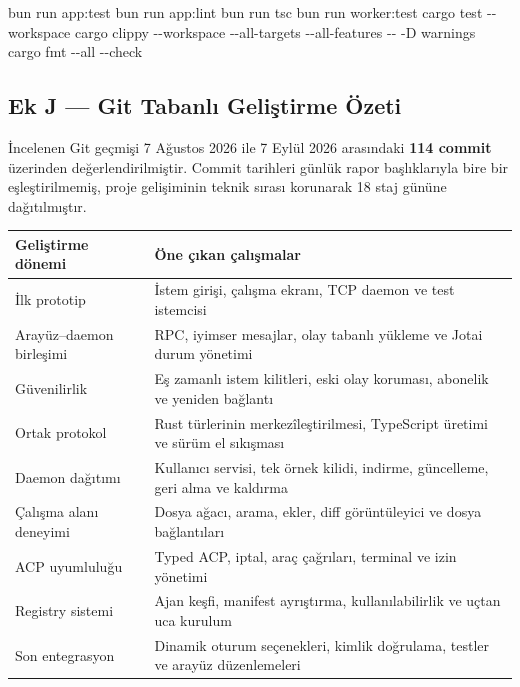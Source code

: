\documentclass[
  turkish,
  10pt,
  a4paper,
]{article}
\newenvironment{Shaded}{}{}
\newcommand{\AttributeTok}[1]{\textcolor[rgb]{0.49,0.56,0.16}{#1}}
\newcommand{\ExtensionTok}[1]{#1}
\newcommand{\NormalTok}[1]{#1}
\begin{document}
\begin{Shaded}
\begin{Highlighting}[]
\ExtensionTok{bun}\NormalTok{ run app:test}
\ExtensionTok{bun}\NormalTok{ run app:lint}
\ExtensionTok{bun}\NormalTok{ run tsc}
\ExtensionTok{bun}\NormalTok{ run worker:test}
\ExtensionTok{cargo}\NormalTok{ test }\AttributeTok{{-}{-}workspace}
\ExtensionTok{cargo}\NormalTok{ clippy }\AttributeTok{{-}{-}workspace} \AttributeTok{{-}{-}all{-}targets} \AttributeTok{{-}{-}all{-}features} \AttributeTok{{-}{-}} \AttributeTok{{-}D}\NormalTok{ warnings}
\ExtensionTok{cargo}\NormalTok{ fmt }\AttributeTok{{-}{-}all} \AttributeTok{{-}{-}check}
\end{Highlighting}
\end{Shaded}

\subsection{Ek J --- Git Tabanlı Geliştirme
Özeti}\label{ek-j--git-tabanlux131-geliux15ftirme-uxf6zeti}

İncelenen Git geçmişi 7 Ağustos 2026 ile 7 Eylül 2026 arasındaki
\textbf{114 commit} üzerinden değerlendirilmiştir. Commit tarihleri
günlük rapor başlıklarıyla bire bir eşleştirilmemiş, proje gelişiminin
teknik sırası korunarak 18 staj gününe dağıtılmıştır.

\begin{longtable}[]{@{}ll@{}}
\toprule\noalign{}
Geliştirme dönemi & Öne çıkan çalışmalar \\
\midrule\noalign{}
\endhead
\bottomrule\noalign{}
\endlastfoot
İlk prototip & İstem girişi, çalışma ekranı, TCP daemon ve test
istemcisi \\
Arayüz--daemon birleşimi & RPC, iyimser mesajlar, olay tabanlı yükleme
ve Jotai durum yönetimi \\
Güvenilirlik & Eş zamanlı istem kilitleri, eski olay koruması, abonelik
ve yeniden bağlantı \\
Ortak protokol & Rust türlerinin merkezîleştirilmesi, TypeScript üretimi
ve sürüm el sıkışması \\
Daemon dağıtımı & Kullanıcı servisi, tek örnek kilidi, indirme,
güncelleme, geri alma ve kaldırma \\
Çalışma alanı deneyimi & Dosya ağacı, arama, ekler, diff görüntüleyici
ve dosya bağlantıları \\
ACP uyumluluğu & Typed ACP, iptal, araç çağrıları, terminal ve izin
yönetimi \\
Registry sistemi & Ajan keşfi, manifest ayrıştırma, kullanılabilirlik ve
uçtan uca kurulum \\
Son entegrasyon & Dinamik oturum seçenekleri, kimlik doğrulama, testler
ve arayüz düzenlemeleri \\
\end{longtable}
\end{document}

